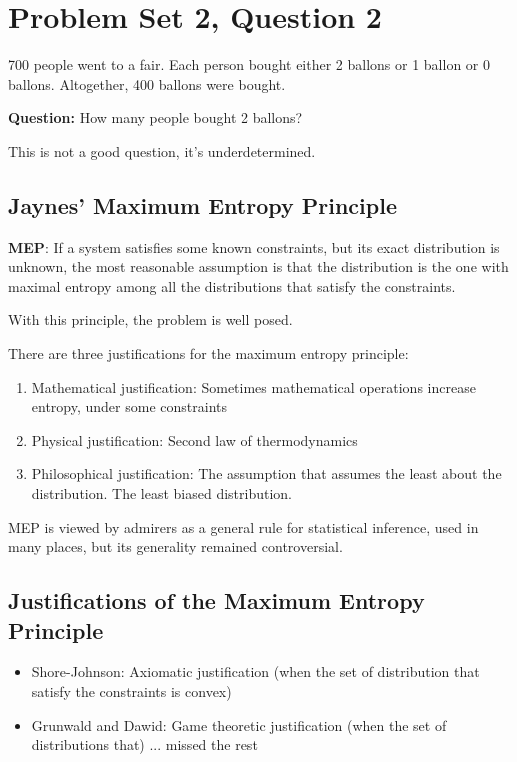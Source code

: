 \documentclass{article}
\begin{document}
\section{Problem Set 2, Question 2}

700 people went to a fair. Each person bought either 2 ballons or 1 ballon or 0 ballons. Altogether, 400 ballons were bought.

\textbf{Question:} How many people bought 2 ballons?

This is not a good question, it's underdetermined.

\subsection{Jaynes' Maximum Entropy Principle}

\textbf{MEP}: If a system satisfies some known constraints, but its exact distribution is unknown, the most reasonable assumption is that the distribution is the one with maximal entropy among all the distributions that satisfy the constraints.

With this principle, the problem is well posed.

There are three justifications for the maximum entropy principle:
\begin{enumerate}
    \item Mathematical justification: Sometimes mathematical operations increase entropy, under some constraints
    \item Physical justification: Second law of thermodynamics
    \item Philosophical justification: The assumption that assumes the least about the distribution. The least biased distribution.
\end{enumerate}
MEP is viewed by admirers as a general rule for statistical inference, used in many places, but its generality remained controversial.

\subsection{Justifications of the Maximum Entropy Principle}
\begin{itemize}
    \item Shore-Johnson: Axiomatic justification (when the set of distribution that satisfy the constraints is convex)
    \item Grunwald and Dawid: Game theoretic justification (when the set of distributions that) ... missed the rest
\end{itemize}
\end{document}
